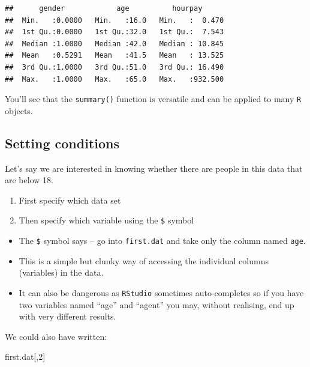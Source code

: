 \documentclass[
]{gitbook}
\newenvironment{Shaded}{\begin{snugshade}}{\end{snugshade}}
\newcommand{\DecValTok}[1]{\textcolor[rgb]{0.00,0.00,0.81}{#1}}
\newcommand{\NormalTok}[1]{#1}
\newcommand{\SpecialCharTok}[1]{\textcolor[rgb]{0.00,0.00,0.00}{#1}}
\providecommand{\tightlist}{%
  \setlength{\itemsep}{0pt}\setlength{\parskip}{0pt}}
\begin{document}
\begin{verbatim}
##      gender            age          hourpay       
##  Min.   :0.0000   Min.   :16.0   Min.   :  0.470  
##  1st Qu.:0.0000   1st Qu.:32.0   1st Qu.:  7.543  
##  Median :1.0000   Median :42.0   Median : 10.845  
##  Mean   :0.5291   Mean   :41.5   Mean   : 13.525  
##  3rd Qu.:1.0000   3rd Qu.:51.0   3rd Qu.: 16.490  
##  Max.   :1.0000   Max.   :65.0   Max.   :932.500
\end{verbatim}

You'll see that the \texttt{summary()} function is versatile and can be applied to many \texttt{R} objects.

\hypertarget{setting-conditions}{%
\subsection{Setting conditions}\label{setting-conditions}}

Let's say we are interested in knowing whether there are people in this data that are below 18.

\begin{enumerate}
\def\labelenumi{\arabic{enumi}.}
\tightlist
\item
  First specify which data set
\item
  Then specify which variable using the \texttt{\$} symbol
\end{enumerate}

\begin{Shaded}
\end{Shaded}

\begin{itemize}
\tightlist
\item
  The \texttt{\$} symbol says -- go into \texttt{first.dat} and take only the column named \texttt{age}.
\item
  This is a simple but clunky way of accessing the individual columns (variables) in the data.
\item
  It can also be dangerous as \texttt{RStudio} sometimes auto-completes so if you have two variables named ``age'' and ``agent'' you may, without realising, end up with very different results.
\end{itemize}

We could also have written:

\begin{Shaded}
\begin{Highlighting}[]
\NormalTok{first.dat[,}\DecValTok{2}\NormalTok{]}
\end{Highlighting}
\end{Shaded}
\end{document}
